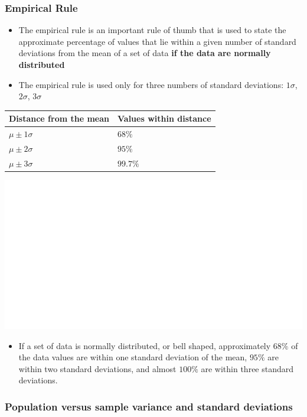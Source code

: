 \documentclass[]{book}
\providecommand{\tightlist}{%
  \setlength{\itemsep}{0pt}\setlength{\parskip}{0pt}}
\begin{document}
\hypertarget{empirical-rule}{%
\subsubsection{Empirical Rule}\label{empirical-rule}}

\begin{itemize}
\item
  The empirical rule is an important rule of thumb that is used to state the approximate percentage of values that lie within a given number of standard deviations from the mean of a set of data \textbf{if the data are normally distributed}
\item
  The empirical rule is used only for three numbers of standard deviations: \(1\sigma\), \(2\sigma\), \(3\sigma\)
\end{itemize}

\begin{longtable}[]{@{}ll@{}}
\toprule
Distance from the mean & Values within distance\tabularnewline
\midrule
\endhead
\(\mu\pm1\sigma\) & \(68\%\)\tabularnewline
\(\mu\pm2\sigma\) & \(95\%\)\tabularnewline
\(\mu\pm3\sigma\) & \(99.7\%\)\tabularnewline
\bottomrule
\end{longtable}

\begin{center}\includegraphics[width=1\linewidth]{figure/emp -1} \end{center}

\begin{itemize}
\tightlist
\item
  If a set of data is normally distributed, or bell shaped, approximately \(68\%\) of the data values are within one standard deviation of the mean, \(95\%\) are within two standard deviations, and almost \(100\%\) are within three standard deviations.
\end{itemize}

\hypertarget{population-versus-sample-variance-and-standard-deviations}{%
\subsubsection{Population versus sample variance and standard deviations}\label{population-versus-sample-variance-and-standard-deviations}}
\end{document}
